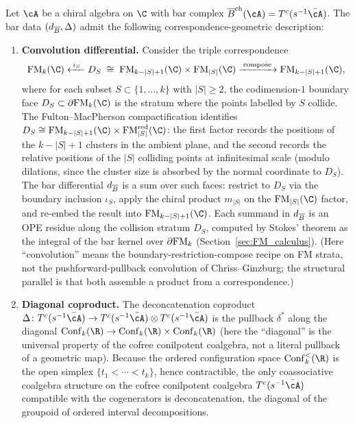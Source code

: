 \begin{proposition}
\label{prop:bar-correspondence}
Let\/ $\cA$ be a chiral algebra on\/ $\C$ with bar complex\/
$\barB^{\mathrm{ch}}(\cA) = T^c(s^{-1}\bar{\cA})$. The bar data
$(d_{\overline{B}}, \Delta)$ admit the following correspondence-geometric
description:
\begin{enumerate}[label=\textup{(\alph*)}]
\item \textbf{Convolution differential.}
 Consider the triple correspondence
 \[
 \FM_k(\C)
 \xleftarrow{\;\iota_S\;}
 D_S \;\cong\; \FM_{k-|S|+1}(\C) \times \FM_{|S|}(\C)
 \xrightarrow{\;\mathrm{compose}\;}
 \FM_{k-|S|+1}(\C),
 \]
 where for each subset\/ $S\subset \{1,\dots,k\}$ with\/
 $|S|\ge 2$, the codimension-$1$ boundary face\/
 $D_S \subset \partial\FM_k(\C)$ is the stratum where the points
 labelled by\/ $S$ collide. The Fulton--MacPherson
 compactification identifies\/ $D_S \cong \FM_{k-|S|+1}(\C)
 \times \FM_{|S|}^{\mathrm{red}}(\C)$: the first factor records the positions
 of the\/ $k-|S|+1$ clusters in the ambient plane, and the second
 records the relative positions of the\/ $|S|$ colliding points at
 infinitesimal scale (modulo dilations, since the cluster size is
 absorbed by the normal coordinate to\/ $D_S$). The bar differential\/ $d_{\overline{B}}$ is a sum
 over such faces: restrict to\/ $D_S$ via the boundary inclusion\/
 $\iota_S$, apply the chiral product\/ $m_{|S|}$ on the\/
 $\FM_{|S|}(\C)$ factor, and re-embed the result into\/
 $\FM_{k-|S|+1}(\C)$. Each summand in\/ $d_{\overline{B}}$ is an OPE
 residue along the collision stratum\/ $D_S$, computed by Stokes'
 theorem as the integral of the bar kernel over\/ $\partial\mathrm{FM}_k$
 (Section~\ref{sec:FM_calculus}).
 (Here ``convolution'' means the boundary-restriction-compose
 recipe on FM strata, not the pushforward-pullback convolution of
 Chriss--Ginzburg; the structural parallel is that both assemble a
 product from a correspondence.)

\item \textbf{Diagonal coproduct.}
 The deconcatenation coproduct\/
 $\Delta\colon T^c(s^{-1}\bar{\cA}) \to
 T^c(s^{-1}\bar{\cA}) \otimes T^c(s^{-1}\bar{\cA})$
 is the pullback\/ $\delta^*$ along the diagonal\/
 $\Conf_k(\R) \to \Conf_k(\R) \times \Conf_k(\R)$
 (here the ``diagonal'' is the universal property of the cofree
 conilpotent coalgebra, not a literal pullback of a geometric map).
 Because the
 ordered configuration space\/ $\Conf_k^{<}(\R)$ is the open
 simplex\/ $\{t_1 < \cdots < t_k\}$, hence contractible,
 the only coassociative coalgebra structure on the cofree
 conilpotent coalgebra\/ $T^c(s^{-1}\bar{\cA})$ compatible with
 the cogenerators is deconcatenation, the diagonal of
 the groupoid of ordered interval decompositions.


\end{enumerate}
\end{proposition}

